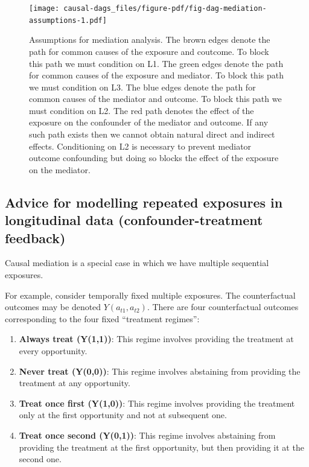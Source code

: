 \documentclass[
  singlecolumn]{report}
\begin{document}
\begin{figure}

{\centering \texttt{[image: causal-dags\_files/figure-pdf/fig-dag-mediation-assumptions-1.pdf]}

}

\caption{\label{fig-dag-mediation-assumptions}Assumptions for mediation
analysis. The brown edges denote the path for common causes of the
exposure and coutcome. To block this path we must condition on L1. The
green edges denote the path for common causes of the exposure and
mediator. To block this path we must condition on L3. The blue edges
denote the path for common causes of the mediator and outcome. To block
this path we must condition on L2. The red path denotes the effect of
the exposure on the confounder of the mediator and outcome. If any such
path exists then we cannot obtain natural direct and indirect effects.
Conditioning on L2 is necessary to prevent mediator outcome confounding
but doing so blocks the effect of the exposure on the mediator.}

\end{figure}

\hypertarget{advice-for-modelling-repeated-exposures-in-longitudinal-data-confounder-treatment-feedback}{%
\subsection{Advice for modelling repeated exposures in longitudinal data
(confounder-treatment
feedback)}\label{advice-for-modelling-repeated-exposures-in-longitudinal-data-confounder-treatment-feedback}}

Causal mediation is a special case in which we have multiple sequential
exposures.

For example, consider temporally fixed multiple exposures. The
counterfactual outcomes may be denoted \(Y(a_{t1} ,a_{t2})\). There are
four counterfactual outcomes corresponding to the four fixed ``treatment
regimes'':

\begin{enumerate}
\def\labelenumi{\arabic{enumi}.}
\item
  \textbf{Always treat (Y(1,1))}: This regime involves providing the
  treatment at every opportunity.
\item
  \textbf{Never treat (Y(0,0))}: This regime involves abstaining from
  providing the treatment at any opportunity.
\item
  \textbf{Treat once first (Y(1,0))}: This regime involves providing the
  treatment only at the first opportunity and not at subsequent one.
\item
  \textbf{Treat once second (Y(0,1))}: This regime involves abstaining
  from providing the treatment at the first opportunity, but then
  providing it at the second one.
\end{enumerate}
\end{document}
